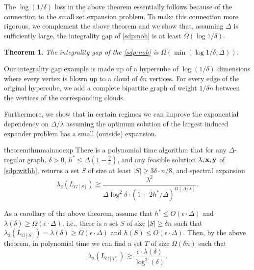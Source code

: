 \documentclass[11pt]{article}
\def\bx{{\bf x}}
\def\by{{\bf y}}
\def\eps{\epsilon}
\newtheorem{theorem}{Theorem}[section]
\begin{document}
The $\log(1/\delta)$ loss in the above theorem essentially follows because of the connection to the small set expansion problem.
To make this connection more rigorous, we complement the above theorem and we show that, assuming $\Delta$ is sufficiently large, 
 the integrality gap of \ref{sdp:noh} is at least $\Omega(\log 1/\delta)$.
\begin{theorem}
\label{thm:IG1}
The integrality gap of the \ref{sdp:noh} is $\Omega (\min(\log 1/\delta,\Delta))$.
\end{theorem}

Our integrality gap example is made up of a hypercube of $\log(1/\delta)$ dimensions where every vertex is blown up to a cloud of $\delta n$ vertices. For every edge of the original hypercube, we add a complete bipartite graph of weight $1/\delta n$ between the vertices of the corresponding clouds.





Furthermore, we show that in certain regimes we can improve the exponential dependency on $\Delta/\lambda$ assuming the optimum solution of the largest induced expander problem has a small (outside) expansion. \begin{restatable}{theorem}{thmmainnoexp}
\label{thm:mainwithoutsideexpansion}
	There is a polynomial time algorithm that for any $\Delta$-regular graph, $\delta>0$, $h^*\leq \Delta(1-\frac2e)$, and any feasible solution $\lambda,\bx,\by$ of \ref{sdp:withh}, returns a set $S$ of size at least $|S|\geq 3\delta \cdot n/8$, and spectral expansion
	$$ \lambda_2(L_{G[S]}) \gtrsim \frac{\lambda^2}{\Delta\log^2 \delta\cdot (1+2h^*/\Delta)^{O(\Delta/\lambda)}}. $$
\end{restatable}
As a corollary of the above theorem, assume that $h^*\leq O(\eps\cdot\Delta)$ and $\lambda(\delta)\geq \Omega(\eps\cdot \Delta)$, i.e., there is a set $S$ of size $|S|\geq \delta n$ such that $\lambda_2(L_{G[S]})=\lambda(\delta)\geq \Omega(\eps\cdot\Delta)$ and $h(S)\leq  O(\eps\cdot \Delta)$. Then, by the above theorem, in polynomial time we can find a set $T$ of size $\Omega(\delta n)$ such that
$$ \lambda_2(L_{G[T]}) \gtrsim \frac{\eps\cdot \lambda(\delta)}{\log^2(\delta)}.$$
\end{document}
